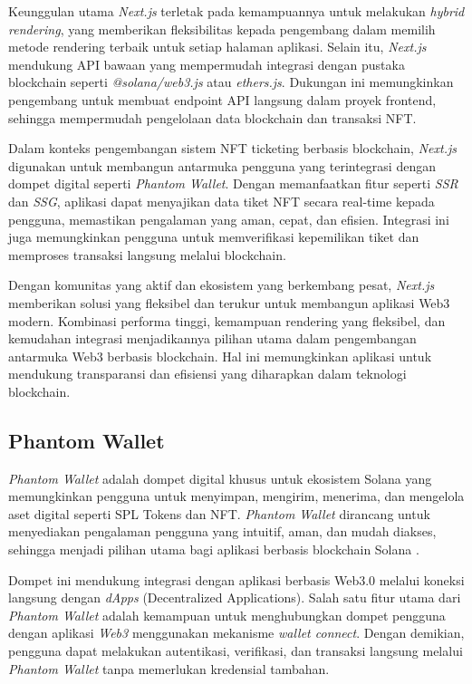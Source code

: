 Keunggulan utama \textit{Next.js} terletak pada kemampuannya untuk melakukan \textit{hybrid rendering}, yang memberikan fleksibilitas kepada pengembang dalam memilih metode rendering terbaik untuk setiap halaman aplikasi. Selain itu, \textit{Next.js} mendukung API bawaan yang mempermudah integrasi dengan pustaka blockchain seperti \textit{@solana/web3.js} atau \textit{ethers.js}. Dukungan ini memungkinkan pengembang untuk membuat endpoint API langsung dalam proyek frontend, sehingga mempermudah pengelolaan data blockchain dan transaksi NFT.

Dalam konteks pengembangan sistem NFT ticketing berbasis blockchain, \textit{Next.js} digunakan untuk membangun antarmuka pengguna yang terintegrasi dengan dompet digital seperti \textit{Phantom Wallet}. Dengan memanfaatkan fitur seperti \textit{SSR} dan \textit{SSG}, aplikasi dapat menyajikan data tiket NFT secara real-time kepada pengguna, memastikan pengalaman yang aman, cepat, dan efisien. Integrasi ini juga memungkinkan pengguna untuk memverifikasi kepemilikan tiket dan memproses transaksi langsung melalui blockchain.

Dengan komunitas yang aktif dan ekosistem yang berkembang pesat, \textit{Next.js} memberikan solusi yang fleksibel dan terukur untuk membangun aplikasi Web3 modern. Kombinasi performa tinggi, kemampuan rendering yang fleksibel, dan kemudahan integrasi menjadikannya pilihan utama dalam pengembangan antarmuka Web3 berbasis blockchain. Hal ini memungkinkan aplikasi untuk mendukung transparansi dan efisiensi yang diharapkan dalam teknologi blockchain.

\subsection{Phantom Wallet}

\textit{Phantom Wallet} adalah dompet digital khusus untuk ekosistem Solana yang memungkinkan pengguna untuk menyimpan, mengirim, menerima, dan mengelola aset digital seperti SPL Tokens dan NFT. \textit{Phantom Wallet} dirancang untuk menyediakan pengalaman pengguna yang intuitif, aman, dan mudah diakses, sehingga menjadi pilihan utama bagi aplikasi berbasis blockchain Solana \parencite{ref9}.

Dompet ini mendukung integrasi dengan aplikasi berbasis Web3.0 melalui koneksi langsung dengan \textit{dApps} (Decentralized Applications). Salah satu fitur utama dari \textit{Phantom Wallet} adalah kemampuan untuk menghubungkan dompet pengguna dengan aplikasi \textit{Web3} menggunakan mekanisme \textit{wallet connect}. Dengan demikian, pengguna dapat melakukan autentikasi, verifikasi, dan transaksi langsung melalui \textit{Phantom Wallet} tanpa memerlukan kredensial tambahan.

